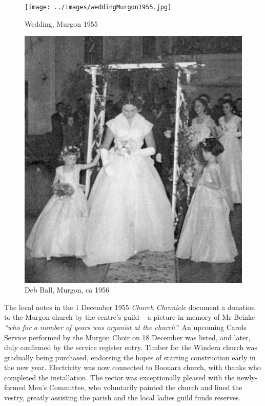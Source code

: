 \begin{figure}
\begin{center}
\texttt{[image: ../images/weddingMurgon1955.jpg]}
\caption{Wedding, Murgon 1955}
\end{center}
\end{figure}










\begin{figure}
\begin{center}
\includegraphics[width=.9\linewidth,center]{../images/debBallMurgon.jpg}
\caption{Deb Ball, Murgon, ca 1956}
\end{center}
\end{figure}




The local notes in the 1 December 1955 \emph{Church Chronicle} document a donation to the Murgon church by the centre's guild -- a picture in memory of Mr Beinke \emph{``who for a number of years was organist at the church}.'' An upcoming Carols Service performed by the Murgon Choir on 18 December was listed, and later, duly confirmed by the service register entry. Timber for the Windera church was gradually being purchased, endorsing the hopes of starting construction early in the new year. Electricity was now connected to Boonara church, with thanks who completed the installation. The rector was exceptionally pleased with the newly-formed Men's Committee, who voluntarily painted the church and lined the vestry, greatly assisting the parish and the local ladies guild funds reserves.




